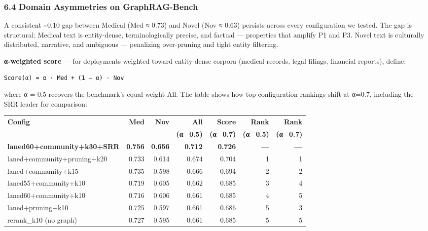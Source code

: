 \documentclass[
]{article}
\begin{document}
\subsubsection{6.4 Domain Asymmetries on
GraphRAG-Bench}\label{domain-asymmetries-on-graphrag-bench}

A consistent \textasciitilde0.10 gap between Medical (Med ≈ 0.73) and
Novel (Nov ≈ 0.63) persists across every configuration we tested. The
gap is structural: Medical text is entity-dense, terminologically
precise, and factual --- properties that amplify P1 and P3. Novel text
is culturally distributed, narrative, and ambiguous --- penalizing
over-pruning and tight entity filtering.

\textbf{α-weighted score} --- for deployments weighted toward
entity-dense corpora (medical records, legal filings, financial
reports), define:

\begin{verbatim}
Score(α) = α · Med + (1 − α) · Nov
\end{verbatim}

where α = 0.5 recovers the benchmark's equal-weight All. The table shows
how top configuration rankings shift at α=0.7, including the SRR leader
for comparison:

\begin{small}
\setlength{\tabcolsep}{5pt}
\begin{longtable}{lrrrrrr}
\toprule
\textbf{Config} & \textbf{Med} & \textbf{Nov} & \textbf{All} & \textbf{Score} & \textbf{Rank} & \textbf{Rank} \\
 & & & \textbf{(α=0.5)} & \textbf{(α=0.7)} & \textbf{(α=0.5)} & \textbf{(α=0.7)} \\
\midrule
\endhead
\textbf{laned60+community+k30+SRR} & \textbf{0.756} & \textbf{0.656} & \textbf{0.712} & \textbf{0.726} & \textbf{—} & \textbf{—} \\
laned+community+pruning+k20 & 0.733 & 0.614 & 0.674 & 0.704 & 1 & 1 \\
laned+community+k15 & 0.735 & 0.598 & 0.666 & 0.694 & 2 & 2 \\
laned55+community+k10 & 0.719 & 0.605 & 0.662 & 0.685 & 3 & 4 \\
laned60+community+k10 & 0.716 & 0.606 & 0.661 & 0.685 & 4 & 5 \\
laned+pruning+k10 & 0.725 & 0.597 & 0.661 & 0.686 & 5 & 3 \\
rerank\_k10 (no graph) & 0.727 & 0.595 & 0.661 & 0.685 & 5 & 5 \\
\bottomrule
\end{longtable}
\end{small}
\end{document}
